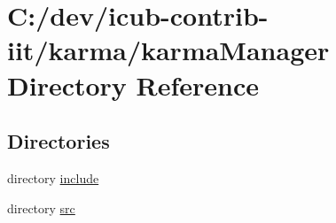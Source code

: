 \section{C\+:/dev/icub-\/contrib-\/iit/karma/karma\+Manager Directory Reference}
\label{dir_16daa9270ea11cd205cba351579bfd71}
\subsection*{Directories}
\begin{DoxyCompactItemize}
\item 
directory \hyperlink{dir_5d568975207dc5f2048f2878312d2b85}{include}
\item 
directory \hyperlink{dir_f4e1b1ef93941e35f62538df412b6f8f}{src}
\end{DoxyCompactItemize}
